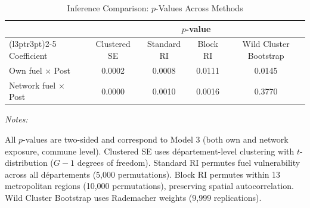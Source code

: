 \begin{table}[!h]
\centering
\caption{Inference Comparison: $p$-Values Across Methods}
\centering
\fontsize{10}{12}\selectfont
\begin{threeparttable}
\begin{tabular}[t]{lcccc}
\toprule
\multicolumn{1}{c}{ } & \multicolumn{4}{c}{$p$-value} \\
\cmidrule(l{3pt}r{3pt}){2-5}
Coefficient & Clustered SE & Standard RI & Block RI & Wild Cluster Bootstrap\\
\midrule
Own fuel $\times$ Post & 0.0002 & 0.0008 & 0.0111 & 0.0145\\
Network fuel $\times$ Post & 0.0000 & 0.0010 & 0.0016 & 0.3770\\
\bottomrule
\end{tabular}
\begin{tablenotes}
\item \textit{Notes:} 
\item All $p$-values are two-sided and correspond to Model 3 (both own and network exposure, commune level). Clustered SE uses d\'{e}partement-level clustering with $t$-distribution ($G-1$ degrees of freedom). Standard RI permutes fuel vulnerability across all d\'{e}partements (5,000 permutations). Block RI permutes within 13 metropolitan regions (10,000 permutations), preserving spatial autocorrelation. Wild Cluster Bootstrap uses Rademacher weights (9,999 replications).
\end{tablenotes}
\end{threeparttable}
\end{table}
